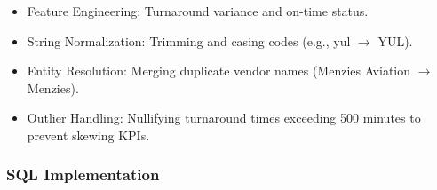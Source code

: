 \documentclass[
  letterpaper,
  DIV=11,
  numbers=noendperiod]{scrartcl}
\begin{document}
\begin{itemize}
\item
  Feature Engineering: Turnaround variance and on-time status.
\item
  String Normalization: Trimming and casing codes (e.g., yul
  \(\rightarrow\) YUL).
\item
  Entity Resolution: Merging duplicate vendor names (Menzies Aviation
  \(\rightarrow\) Menzies).
\item
  Outlier Handling: Nullifying turnaround times exceeding 500 minutes to
  prevent skewing KPIs.
\end{itemize}

\subsubsection{SQL Implementation}
\end{document}
